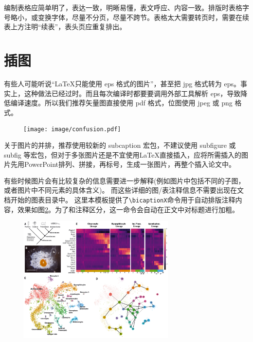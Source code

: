 编制表格应简单明了，表达一致，明晰易懂，表文呼应、内容一致。排版时表格字号略小，或变换字体，尽量不分页，尽量不跨节。表格太大需要转页时，需要在续表上方注明“续表”，表头页应重复排出。

\section{插图}
\label{sec:figure}
有些人可能听说“\LaTeX 只能使用 eps 格式的图片”，甚至把 jpg 格式转为 eps。事实上，这种做法已经过时。而且每次编译时都要要调用外部工具解析 eps，导致降低编译速度。所以我们推荐矢量图直接使用 pdf 格式，位图使用 jpeg 或 png 格式。
\begin{figure}[h] 
	\centering
	\texttt{[image: image/confusion.pdf]}
	\label{fig:confusion}
\end{figure}

关于图片的并排，推荐使用较新的 subcaption 宏包，不建议使用 subfigure 或 subfig 等宏包，但对于多张图片还是不宜使用\LaTeX 直接插入，应将所需插入的图片先用PowerPoint排列、拼接，再标号，生成一张图片，再整个插入论文中。

有些时候图片会有比较复杂的信息需要进一步解释(例如图片中包括不同的子图，或者图片中不同元素的具体含义)。
而这些详细的图/表注释信息不需要出现在文档开始的图表目录中。
这里本模板提供了\verb|\bicaptionX|命令用于自动排版注释内容，效果如图\ref{fig:sponge}。为了和注释区分，这一命令会自动在正文中对标题进行加粗。

\begin{figure}[h] 
	\centering
	\includegraphics[width=0.7\textwidth]{image/sponge-celltype.jpg}
	\label{fig:sponge}
\end{figure}

